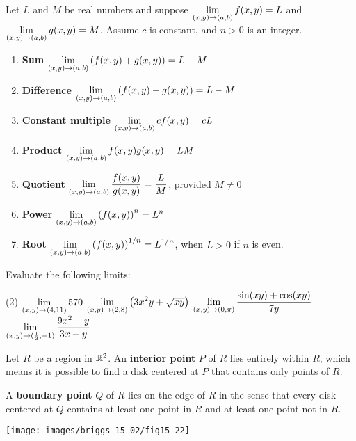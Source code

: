 \documentclass[mathNotesPreamble]{subfiles}
\begin{document}
  \begin{thmBox*}
    Let $L$ and $M$ be real numbers and suppose $\displaystyle\lim_{(x,y)\to (a,b)} f(x,y)=L$ and \newline $\displaystyle\lim_{(x,y)\to (a,b)} g(x,y)=M$. Assume $c$ is constant, and $n>0$ is an integer.
    \begin{enumerate}[itemsep=0.65\baselineskip]
      \item \textbf{Sum} \tab $\displaystyle\lim_{(x,y)\to (a,b)} {\left(f(x,y)+g(x,y)\right)}=L+M$
      \item \textbf{Difference} \tab $\displaystyle\lim_{(x,y)\to (a,b)} {\left(f(x,y)-g(x,y)\right)}=L-M$
      \item \textbf{Constant multiple} \tab $\displaystyle\lim_{(x,y)\to (a,b)} cf(x,y)=cL$
      \item \textbf{Product} \tab $\displaystyle\lim_{(x,y)\to (a,b)} f(x,y)g(x,y)=LM$
      \item \textbf{Quotient} \tab $\displaystyle\lim_{(x,y)\to (a,b)} \frac{f(x,y)}{g(x,y)}=\frac{L}{M}$, \tab provided $M\neq 0$
      \item \textbf{Power} \tab $\displaystyle\lim_{(x,y)\to (a,b)} {\left(f(x,y)\right)}^n=L^n$
      \item \textbf{Root} \tab $\displaystyle\lim_{(x,y)\to (a,b)} {\left(f(x,y)\right)}^{1/n}=L^{1/n}$, \tab when $L>0$ if $n$ is even.
    \end{enumerate}
  \end{thmBox*}
  \pagebreak

  \begin{ex*}
    Evaluate the following limits:
  \end{ex*}

  \begin{tasks}[after-item-skip=\stretch{1}, label=](2)
    \task $\displaystyle\lim_{(x,y)\to (4,11)} 570$
    \task $\displaystyle\lim_{(x,y)\to (2,8)} {\left(3x^2y+\sqrt{xy}\right)}$
    \task $\displaystyle\lim_{(x,y)\to (0,\pi)} \frac{\sin(xy)+\cos(xy)}{7y}$
    \task $\displaystyle\lim_{(x,y)\to (\frac{1}{3},-1)} \frac{9x^2-y}{3x+y}$
  \end{tasks}
  \pagebreak

  \begin{defn*}
    Let $R$ be a region in $\mathbb{R}^2$. An \textbf{interior point} $P$ of $R$ lies entirely within $R$, which means it is possible to find a disk centered at $P$ that contains only points of $R$.
    \vspace*{\baselineskip}
    
    A \textbf{boundary point} $Q$ of $R$ lies on the edge of $R$ in the sense that every disk centered at $Q$ contains at least one point in $R$ and at least one point not in $R$.
  \end{defn*}
  \begin{center}
    \texttt{[image: images/briggs\_15\_02/fig15\_22]}
  \end{center}
\end{document}
